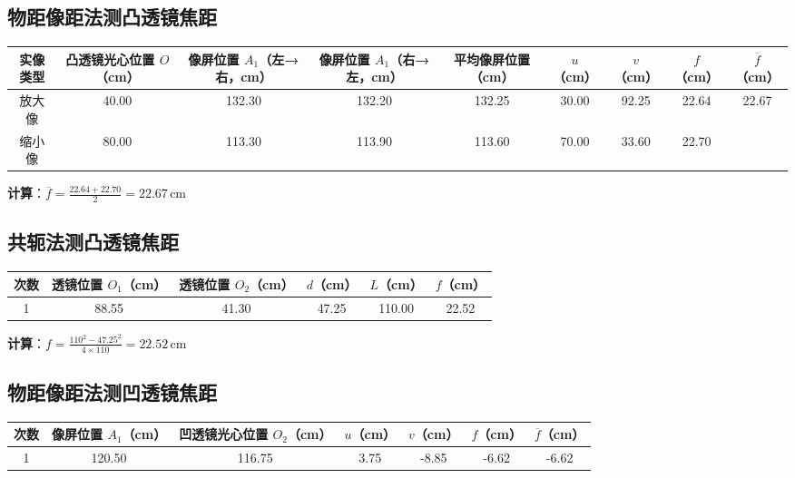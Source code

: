 \documentclass[12pt,a4paper]{article}
\begin{document}
\subsection{物距像距法测凸透镜焦距}

\begin{table}[H]
\centering
\begin{tabular}{|c|c|c|c|c|c|c|c|c|}
\hline
实像类型 & 凸透镜光心位置 $O$（cm） & 像屏位置 $A_1$（左→右，cm） & 像屏位置 $A_1$（右→左，cm） & 平均像屏位置（cm） & $u$（cm） & $v$（cm） & $f$（cm） & $\overline{f}$（cm） \\
\hline
放大像 & 40.00 & 132.30 & 132.20 & 132.25 & 30.00 & 92.25 & 22.64 & 22.67 \\
\hline
缩小像 & 80.00 & 113.30 & 113.90 & 113.60 & 70.00 & 33.60 & 22.70 & \\
\hline
\end{tabular}
\end{table}

\textbf{计算}：$\overline{f} = \frac{22.64 + 22.70}{2} = 22.67 \, \text{cm}$

\subsection{共轭法测凸透镜焦距}

\begin{table}[H]
\centering
\begin{tabular}{|c|c|c|c|c|c|}
\hline
次数 & 透镜位置 $O_1$（cm） & 透镜位置 $O_2$（cm） & $d$（cm） & $L$（cm） & $f$（cm） \\
\hline
1 & 88.55 & 41.30 & 47.25 & 110.00 & 22.52 \\
\hline
\end{tabular}
\end{table}

\textbf{计算}：$f = \frac{110^2 - 47.25^2}{4 \times 110} = 22.52 \, \text{cm}$

\subsection{物距像距法测凹透镜焦距}

\begin{table}[H]
\centering
\begin{tabular}{|c|c|c|c|c|c|c|}
\hline
次数 & 像屏位置 $A_1$（cm） & 凹透镜光心位置 $O_2$（cm） & $u$（cm） & $v$（cm） & $f$（cm） & $\overline{f}$（cm） \\
\hline
1 & 120.50 & 116.75 & 3.75 & -8.85 & -6.62 & -6.62 \\
\hline
\end{tabular}
\end{table}
\end{document}
